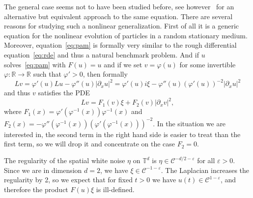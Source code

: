 \documentclass[a4paper,11pt]{article}
\theoremstyle{remark}
\newcommand{\CC}{\ensuremath{\mathscr{C}}}
\begin{document}
The general case seems not to have been studied before, see however~\cite{Hairer2013a} for an alternative but equivalent approach to the same equation. There are several reasons for studying such a nonlinear generalization. First of all it is a generic equation for the nonlinear evolution of particles in a random stationary medium. Moreover, equation~\eqref{eq:pam} is formally very similar to the rough differential equation~{\eqref{eq:rde}} and thus a natural benchmark problem. And if $u$ solves~\eqref{eq:pam} with $F(u) = u$ and if we set $v = \varphi (u)$ for
some invertible $\varphi : \mathbb{R} \rightarrow \mathbb{R}$ such that
$\varphi' > 0$, then formally
\[
   L v = \varphi' (u) L u - \varphi'' (u) | \partial_x u |^2 = \varphi' (u) i \xi - \varphi''
   (u) (\varphi' (u))^{- 2} | \partial_x u |^2
\]
and thus $v$ satisfies the PDE
\[
   L v = F_1 (v) \xi + F_2(v) |\partial_x v|^2,
\]
where $F_1 (x) = \varphi' (\varphi^{- 1} (x)) \varphi^{- 1} (x)$ and $F_2 (x)
= - \varphi'' (\varphi^{- 1} (x)) (\varphi' (\varphi^{- 1} (x)))^{- 2}$. In
the situation we are interested in, the second term in the right hand side is
easier to treat than the first term, so we will drop it
and concentrate on the case $F_2 = 0$.

The regularity of the spatial white noise $\eta$ on $\mathbb{T}^{d}$ is $\eta \in \CC^{-d/2- \varepsilon}$ for all $\varepsilon >0$. Since we are
in dimension $d=2$, we have $\xi \in \CC^{-1- \varepsilon}$. The
Laplacian increases the regularity by 2, so we expect that for fixed $t>0$ we
have $u ( t ) \in \CC^{1- \varepsilon}$, and therefore the product
$F ( u ) \xi$ is ill-defined.
\end{document}
